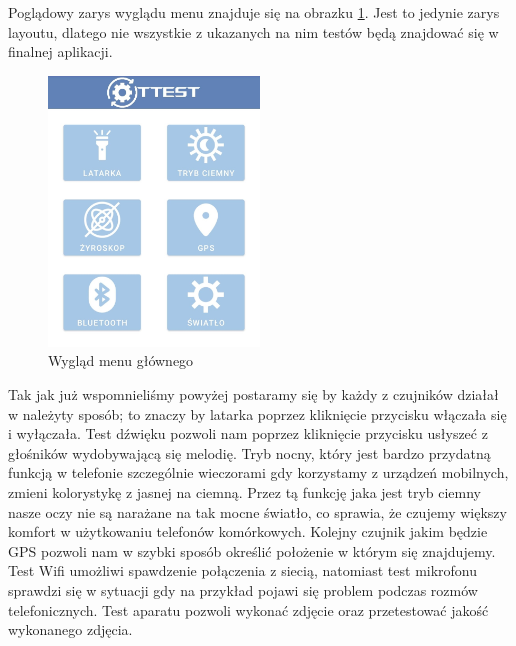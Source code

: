 \newpage

Poglądowy zarys wyglądu menu znajduje się na obrazku \ref{rys:menu}. Jest to jedynie zarys layoutu, dlatego nie wszystkie z ukazanych na nim testów będą znajdować się w finalnej aplikacji. \newline

\begin{figure}[!hbt]
	\begin{center}
		\includegraphics[angle=360, width=0.50\textwidth]{rys/punkt2/menu.jpg}
		\caption{Wygląd menu głównego}
		\label{rys:menu}
	\end{center}
\end{figure}

Tak jak już wspomnieliśmy powyżej postaramy się by każdy z czujników działał w należyty sposób; to znaczy by latarka poprzez kliknięcie przycisku włączała się i wyłączała. Test dźwięku pozwoli nam poprzez kliknięcie przycisku usłyszeć z głośników wydobywającą się melodię. Tryb nocny, który jest bardzo przydatną funkcją w telefonie szczególnie wieczorami gdy korzystamy z urządzeń mobilnych, zmieni kolorystykę z jasnej na ciemną. Przez tą funkcję jaka jest tryb ciemny nasze oczy nie są narażane na tak mocne światło, co sprawia, że czujemy większy komfort w użytkowaniu telefonów komórkowych. Kolejny czujnik jakim będzie GPS pozwoli nam w szybki sposób określić położenie w którym się znajdujemy. Test Wifi umożliwi spawdzenie połączenia z siecią, natomiast test mikrofonu sprawdzi się w sytuacji gdy na przykład pojawi się problem podczas rozmów telefonicznych. Test aparatu pozwoli wykonać zdjęcie oraz przetestować jakość wykonanego zdjęcia. \newline

\newpage

